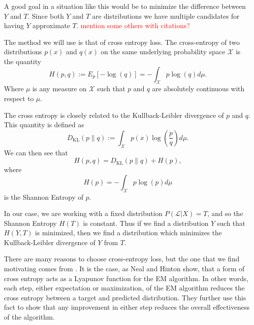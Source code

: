 
A good goal  in a situation like this would be to minimize the difference between $Y$ 
and $T$. Since both $Y$ and $T$ are distributions we have multiple candidates for 
having $Y$ approximate $T$. \textcolor{red}{mention some others with citations?}

The method we will use is that of cross entropy loss.  The cross-entropy of two 
distributions $p(x)$ and $q(x)$ on the same underlying probability space 
$\mathcal{X}$ is the quantity 
\begin{equation}
H(p,q):= E_p[-\log (q)] = -\int_{\mathcal{X}} p\log (q) d\mu.
\end{equation}
Where $\mu$ is any measure on $\mathcal{X}$ such that $p$ and $q$ are absolutely
continuous with respect to $\mu$.

The cross entropy is closely related to the Kullback-Leibler divergence of $p$ and $q$.
This quantity is defined as
\[D_{\text{KL}}(p\parallel q):=\int_{\mathcal{X}}p(x)\log\left(\dfrac{p}{q}\right)d\mu.\]
We can then see that 
\[H(p,q)= D_{\text{KL}}(p\parallel q)+H(p),\]
where 
\[H(p) = -\int_{\mathcal{X}}p\log(p)d\mu\]
is the Shannon Entropy of $p$.

In our case, we are working with a fixed distribution $P(\mathcal{L}|X)=T$, and so the
Shannon Entropy $H(T)$ is constant.  Thus if we find a distribution $Y$ such that 
$H(Y,T)$ is minimized, then we find a distribution which minimizes the Kullback-Leibler
divergence of $Y$ from $T$.


There are many reasons to choose cross-entropy loss, but the one that we find motivating
comes from \cite{NealHintonEM1999}.  It is the case, as Neal and Hinton show, that a form
of cross entropy acts as a Lyapunov function for the EM algorithm. In other words, each
step, either expectation or maximization, of the EM algorithm reduces the cross entropy 
between a target and predicted distribution.  They further use this fact to show that any 
improvement in either step reduces the overall effectiveness of the algorithm.

